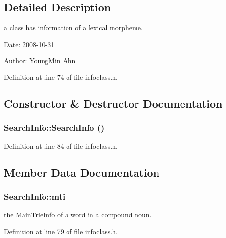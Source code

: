 \subsection{Detailed Description}
a class has information of a lexical morpheme. 

\begin{Desc}
\item[Date:]2008-10-31 \end{Desc}
\begin{Desc}
\item[Author:]YoungMin Ahn \end{Desc}


Definition at line 74 of file infoclass.h.

\subsection{Constructor \& Destructor Documentation}
\hypertarget{classSearchInfo_da258dde857ea529cad08b93c8f01aa2}{
\subsubsection[{SearchInfo}]{\setlength{\rightskip}{0pt plus 5cm}SearchInfo::SearchInfo ()}}
\label{classSearchInfo_da258dde857ea529cad08b93c8f01aa2}




Definition at line 84 of file infoclass.h.

\subsection{Member Data Documentation}
\hypertarget{classSearchInfo_e7aed0fc570d3716eba7231ea01dbeb0}{
\subsubsection[{mti}]{ {\bf SearchInfo::mti}}}
\label{classSearchInfo_e7aed0fc570d3716eba7231ea01dbeb0}


the \hyperlink{classMainTrieInfo}{MainTrieInfo} of a word in a compound noun. 



Definition at line 79 of file infoclass.h.

